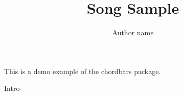 \documentclass[11pt]{article}
\title{Song Sample}
\author{Author name}
\begin{document}
\songtitle

This is a demo example of the chordbars package.

\begin{chordbar}{4}{1}{Intro}
\end{chordbar}
\end{document}
